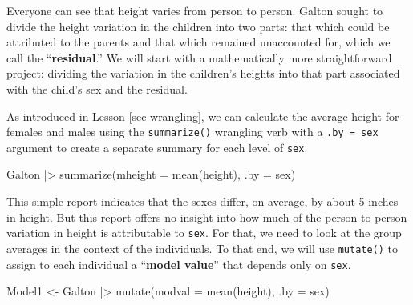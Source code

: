 \documentclass[
  letterpaper,
  DIV=11,
  numbers=noendperiod,
  oneside]{scrartcl}
\newenvironment{Shaded}{\begin{snugshade}}{\end{snugshade}}
\newcommand{\AttributeTok}[1]{\textcolor[rgb]{0.40,0.45,0.13}{#1}}
\newcommand{\FunctionTok}[1]{\textcolor[rgb]{0.28,0.35,0.67}{#1}}
\newcommand{\NormalTok}[1]{\textcolor[rgb]{0.00,0.23,0.31}{#1}}
\newcommand{\OtherTok}[1]{\textcolor[rgb]{0.00,0.23,0.31}{#1}}
\newcommand{\SpecialCharTok}[1]{\textcolor[rgb]{0.37,0.37,0.37}{#1}}
\begin{document}
Everyone can see that height varies from person to person. Galton sought
to divide the height variation in the children into two parts: that
which could be attributed to the parents and that which remained
unaccounted for, which we call the ``\textbf{residual}.'' We will start
with a mathematically more straightforward project: dividing the
variation in the children's heights into that part associated with the
child's sex and the residual.

As introduced in Lesson \ref{sec-wrangling}, we can calculate the
average height for females and males using the \texttt{summarize()}
wrangling verb with a \texttt{.by\ =\ sex} argument to create a separate
summary for each level of \texttt{sex}.

\begin{Shaded}
\begin{Highlighting}[]
\NormalTok{Galton }\SpecialCharTok{|\textgreater{}}
  \FunctionTok{summarize}\NormalTok{(}\AttributeTok{mheight =} \FunctionTok{mean}\NormalTok{(height), }\AttributeTok{.by =}\NormalTok{ sex)}
\end{Highlighting}
\end{Shaded}

{}

This simple report indicates that the sexes differ, on average, by about
5 inches in height. But this report offers no insight into how much of
the person-to-person variation in height is attributable to
\texttt{sex}. For that, we need to look at the group averages in the
context of the individuals. To that end, we will use \texttt{mutate()}
to assign to each individual a ``\textbf{model value}'' that depends
only on \texttt{sex}.

\begin{Shaded}
\begin{Highlighting}[]
\NormalTok{Model1 }\OtherTok{\textless{}{-}}\NormalTok{ Galton }\SpecialCharTok{|\textgreater{}}
  \FunctionTok{mutate}\NormalTok{(}\AttributeTok{modval =} \FunctionTok{mean}\NormalTok{(height), }\AttributeTok{.by =}\NormalTok{ sex) }
\end{Highlighting}
\end{Shaded}
\end{document}
